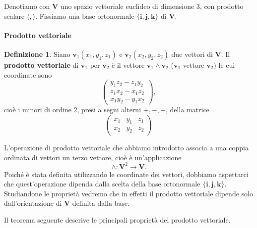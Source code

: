 \documentclass{article}
\theoremstyle{plain}
\theoremstyle{definition}
\newtheorem{defn}{Definizione}[section]
\theoremstyle{remark}
\begin{document}
Denotiamo con $\mathbf{V}$ uno spazio vettoriale euclideo di dimensione $3$, 
con prodotto scalare $\langle,\rangle$. Fissiamo una base ortonormale $\{\mathbf{i},\mathbf{j},\mathbf{k}\}$
di $\mathbf{V}$.

\vspace{10pt}

\paragraph{Prodotto vettoriale}
\begin{bxthm}
\begin{defn}
Siano $\mathbf{v}_1(x_1, y_1, z_1)$ e $\mathbf{v}_2(x_2, y_2, z_2)$ due vettori di $\mathbf{V}$.
Il \textbf{prodotto vettoriale} di $\mathbf{v}_1$ per $\mathbf{v}_2$ è il vettore
$\mathbf{v}_1 \wedge \mathbf{v}_2$ ($\mathbf{v}_1$ vettore $\mathbf{v}_2$) le cui coordinate sono
\[
\begin{pmatrix}
y_1 z_2 - z_1 y_2\\
z_1 x_2 - x_1 z_2\\
x_1 y_2 - y_1 x_2    
\end{pmatrix},
\]
cioè i minori di ordine $2$, presi a segni alterni $+,-,+$, della matrice
\[
\begin{pmatrix}
x_1 & y_1 & z_1\\
x_2 & y_2 & z_2
\end{pmatrix}
\]    
\end{defn}
\end{bxthm}

\vspace{10pt}

L'operazione di prodotto vettoriale che abbiamo introdotto associa a una coppia ordinata di vettori 
un terzo vettore, cioè è un'applicazione
\[
\wedge:\mathbf{V}^2 \to \mathbf{V}.
\]
Poiché è stata definita utilizzando le coordinate dei vettori, dobbiamo aspettarci che quest'operazione 
dipenda dalla scelta della base ortonormale $\{ \mathbf{i}, \mathbf{j}, \mathbf{k} \}$. 
Studiandone le proprietà vedremo che in effetti il prodotto vettoriale dipende solo dall'orientazione di 
$\mathbf{V}$ definita dalla base.

\vspace{10pt}

Il teorema seguente descrive le principali proprietà del prodotto vettoriale.

\vspace{10pt}
\end{document}
